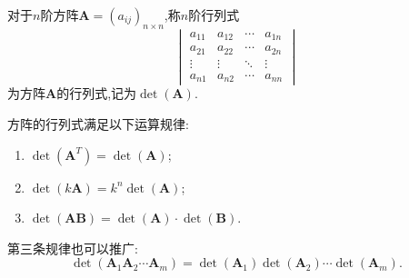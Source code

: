 \begin{definition}
	对于$n$阶方阵$\mathbf{A}=(a_{ij})_{n\times n}$,称$n$阶行列式
	\[
		\begin{vmatrix}
			a_{11} & a_{12} & \cdots & a_{1n} \\
			a_{21} & a_{22} & \cdots & a_{2n} \\
			\vdots & \vdots & \ddots & \vdots \\
			a_{n1} & a_{n2} & \cdots & a_{nn}
		\end{vmatrix}
	\]
	为方阵$\mathbf{A}$的行列式,记为$\det(\mathbf{A})$.
\end{definition}

方阵的行列式满足以下运算规律:
\begin{enumerate}
	\item $\det(\mathbf{A}^T)=\det(\mathbf{A})$;
	\item $\det(k\mathbf{A})=k^n \det(\mathbf{A})$;
	\item $\det(\mathbf{AB})=\det(\mathbf{A})\cdot \det(\mathbf{B})$.
\end{enumerate}
第三条规律也可以推广:
\[
	\det(\mathbf{A}_1\mathbf{A}_2\cdots \mathbf{A}_m)=\det(\mathbf{A}_1)\det(\mathbf{A}_2)\cdots\det(\mathbf{A}_m).
\]